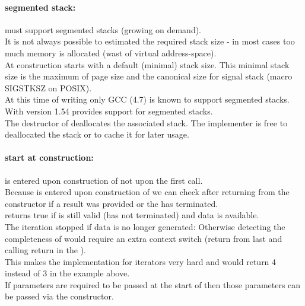 \paragraph*{segmented stack:}
\coro must support segmented stacks (growing on demand).\\
\newline
It is not always possible to estimated the required stack size - in most cases
too much memory is allocated (wast of virtual address-space).\\
\newline
At construction \coro starts with a default (minimal) stack size. This minimal
stack size is the maximum of page size and the canonical size for signal stack
(macro SIGSTKSZ on POSIX).\\
\newline
At this time of writing only GCC (4.7) is known to support segmented
stacks. With version 1.54 \boostcoroutine provides support for segmented stacks.\\
\newline
The destructor of \coro deallocates the associated stack. The implementer is
free to deallocated the stack or to cache it for later usage.

\paragraph*{start at construction:}
\corofunction is entered upon construction of \coro not upon the first call.\\
\newline
Because \corofunction is entered upon construction of \coro we can check after
returning from the constructor if a result was provided or the \corofunction
has terminated.\\
\corobool returns true if \coro is still valid (\corofunction has not terminated)
and data is available.\\
The iteration stopped if data is no longer generated:
Otherwise detecting the completeness of \coro would require an extra context
switch (return from last \coroop and calling return in the \corofunction).\\
This makes the implementation for iterators very hard and 
would return 4 instead of 3 in the example above.\\
\newline
If parameters are required to be passed at the start of \corofunction then those
parameters can be passed via the \coro constructor.

